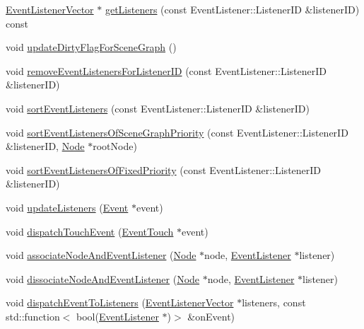 \begin{DoxyCompactItemize}
\item 
\hyperlink{classEventDispatcher_1_1EventListenerVector}{Event\+Listener\+Vector} $\ast$ \hyperlink{classEventDispatcher_aa2b7f1d5ebfcef5c2bfedb81b6917906}{get\+Listeners} (const Event\+Listener\+::\+Listener\+ID \&listener\+ID) const
\item 
void \hyperlink{classEventDispatcher_a281d3a00951ec4a7b628bc5a08d2b309}{update\+Dirty\+Flag\+For\+Scene\+Graph} ()
\item 
void \hyperlink{classEventDispatcher_a456c75992716910637994a70ee65a37e}{remove\+Event\+Listeners\+For\+Listener\+ID} (const Event\+Listener\+::\+Listener\+ID \&listener\+ID)
\item 
void \hyperlink{classEventDispatcher_ab194c90a0a72abc2e53f922abc1fa7e4}{sort\+Event\+Listeners} (const Event\+Listener\+::\+Listener\+ID \&listener\+ID)
\item 
void \hyperlink{classEventDispatcher_a6afb74a0ae37c6653e50f5cddfaa0dd2}{sort\+Event\+Listeners\+Of\+Scene\+Graph\+Priority} (const Event\+Listener\+::\+Listener\+ID \&listener\+ID, \hyperlink{classNode}{Node} $\ast$root\+Node)
\item 
void \hyperlink{classEventDispatcher_a83e6fcd45dbc28743b3dc015a3061ef2}{sort\+Event\+Listeners\+Of\+Fixed\+Priority} (const Event\+Listener\+::\+Listener\+ID \&listener\+ID)
\item 
void \hyperlink{classEventDispatcher_a936a4600edda5168541a8ab42dd27056}{update\+Listeners} (\hyperlink{classEvent}{Event} $\ast$event)
\item 
void \hyperlink{classEventDispatcher_a5dd8af31b358bbe217180ac29909b3aa}{dispatch\+Touch\+Event} (\hyperlink{classEventTouch}{Event\+Touch} $\ast$event)
\item 
void \hyperlink{classEventDispatcher_ae82e15825f3fe6d5d2a32aab9214ddc0}{associate\+Node\+And\+Event\+Listener} (\hyperlink{classNode}{Node} $\ast$node, \hyperlink{classEventListener}{Event\+Listener} $\ast$listener)
\item 
void \hyperlink{classEventDispatcher_a43a5aaec61fcbec266dc62a50de7cbad}{dissociate\+Node\+And\+Event\+Listener} (\hyperlink{classNode}{Node} $\ast$node, \hyperlink{classEventListener}{Event\+Listener} $\ast$listener)
\item 
void \hyperlink{classEventDispatcher_a5809ae1e58312586afdff6d11b821957}{dispatch\+Event\+To\+Listeners} (\hyperlink{classEventDispatcher_1_1EventListenerVector}{Event\+Listener\+Vector} $\ast$listeners, const std\+::function$<$ bool(\hyperlink{classEventListener}{Event\+Listener} $\ast$)$>$ \&on\+Event)

\end{DoxyCompactItemize}
